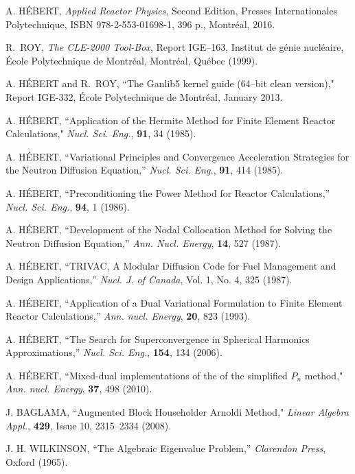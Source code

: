 \begin{thebibliography}{99}

A. H\'EBERT, {\sl Applied Reactor Physics}, Second Edition, Presses Internationales Polytechnique, ISBN 978-2-553-01698-1, 396 p., Montr\'eal, 2016.

R.~ROY, \textsl{The CLE-2000 Tool-Box}, 
Report IGE--163, Institut de g\'enie nucl\'eaire, \'{E}cole Polytechnique de Montr\'eal,
Montr\'{e}al, Qu\'{e}bec (1999).

A. H\'EBERT and R.~ROY,
``The Ganlib5 kernel guide (64--bit clean version),"
Report IGE-332, \'Ecole Polytechnique de Montr\'eal, January 2013.

A. H\'EBERT, ``Application of the Hermite Method for Finite Element Reactor Calculations," {\sl Nucl. Sci. Eng.}, {\bf 91}, 34 (1985).

A. H\'EBERT, ``Variational Principles and Convergence Acceleration Strategies for the Neutron Diffusion Equation,'' {\sl Nucl. Sci. Eng.}, {\bf 91}, 414 (1985).

A. H\'EBERT, ``Preconditioning the Power Method for Reactor Calculations,'' {\sl Nucl. Sci. Eng.}, {\bf 94}, 1 (1986).

A. H\'EBERT, ``Development of the Nodal Collocation Method for Solving the Neutron Diffusion Equation,'' {\sl Ann. Nucl. Energy}, {\bf 14}, 527 (1987).

A. H\'EBERT, ``TRIVAC, A Modular Diffusion Code for Fuel Management and Design Applications,'' {\sl Nucl. J. of Canada}, Vol. 1, No. 4, 325 (1987).

A. H\'EBERT, ``Application of a Dual Variational Formulation to Finite Element Reactor Calculations,'' {\sl Ann. nucl. Energy}, {\bf 20}, 823 (1993).

A. H\'EBERT, ``The Search for Superconvergence in Spherical Harmonics Approximations,'' {\sl Nucl. Sci. Eng.}, {\bf 154}, 134 (2006).

A. H\'EBERT, ``Mixed-dual implementations of the of the simplified $P_n$ method," {\sl Ann. nucl. Energy}, {\bf 37}, 498 (2010).

J. BAGLAMA, ``Augmented Block Householder Arnoldi Method,"
{\sl Linear Algebra Appl.}, {\bf 429}, Issue 10, 2315--2334 (2008).

J. H. WILKINSON, ``The Algebraic Eigenvalue Problem,'' {\sl Clarendon Press}, Oxford (1965).


\end{thebibliography}
